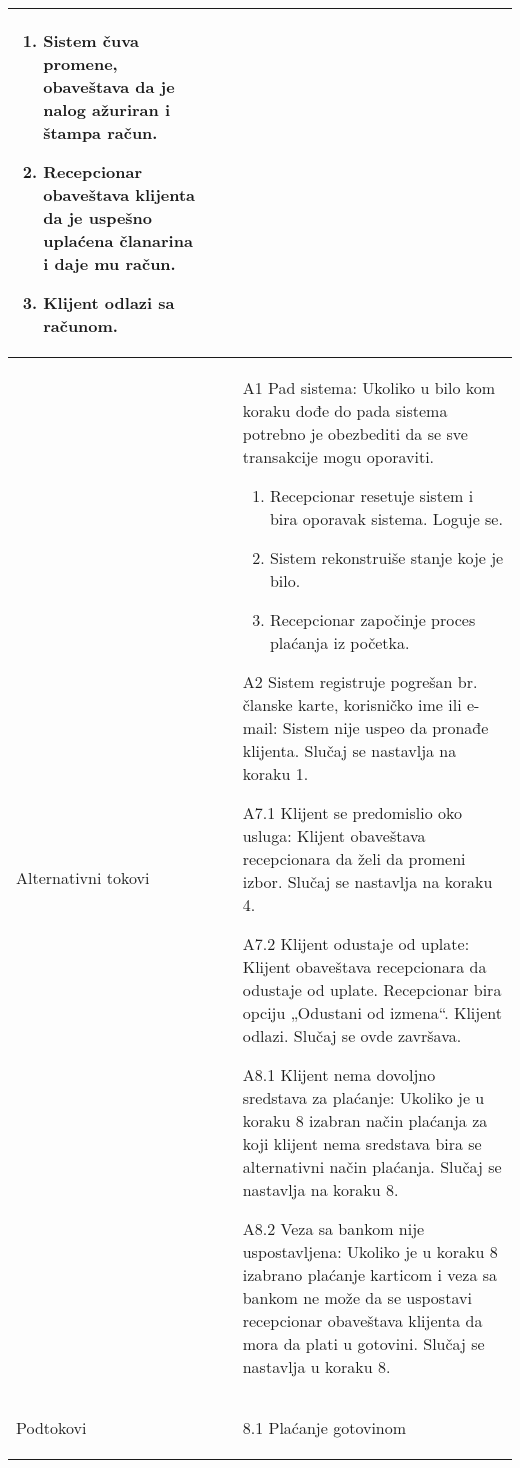 \documentclass[../main.tex]{subfiles}
\begin{document}
\begin{longtable}{| p{} | p{} |}
\begin{enumerate}
        \item Sistem čuva promene, obaveštava da je nalog ažuriran i štampa račun.
        \item Recepcionar obaveštava klijenta da je uspešno uplaćena članarina i daje mu račun.
        \item Klijent odlazi sa računom.
    \end{enumerate}\\
\hline
    Alternativni tokovi & \begin{itemize}
        \item[A1] Pad sistema: Ukoliko u bilo kom koraku dođe do pada sistema potrebno je obezbediti da se sve transakcije mogu oporaviti.\begin{enumerate}
            \item Recepcionar resetuje sistem i bira oporavak sistema. Loguje se.
            \item Sistem rekonstruiše stanje koje je bilo.
            \item Recepcionar započinje proces plaćanja iz početka.
        \end{enumerate}
        \item[A2] Sistem registruje pogrešan br. članske karte, korisničko ime ili e-mail:  Sistem nije uspeo da pronađe klijenta. Slučaj se nastavlja na koraku 1.
        \item[A7.1] Klijent se predomislio oko usluga: Klijent obaveštava recepcionara da želi da promeni izbor. Slučaj se nastavlja na koraku 4.
        \item[A7.2] Klijent odustaje od uplate: Klijent obaveštava recepcionara da odustaje od uplate. Recepcionar bira opciju „Odustani od izmena“. Klijent odlazi. Slučaj se ovde završava.
        \item[A8.1] Klijent nema dovoljno sredstava za plaćanje: Ukoliko je u koraku 8 izabran način plaćanja za koji klijent nema sredstava bira se alternativni način plaćanja. Slučaj se nastavlja na koraku 8.
        \item[A8.2] Veza sa bankom nije uspostavljena: Ukoliko je u koraku 8 izabrano plaćanje karticom i veza sa bankom ne može da se uspostavi recepcionar obaveštava klijenta da mora da plati u gotovini. Slučaj se nastavlja u koraku 8.
    \end{itemize}\\
\hline
    Podtokovi & \begin{itemize}
        \item[8.1] Plaćanje gotovinom \begin{enumerate}

\end{enumerate}
\end{itemize}
\end{longtable}
\end{document}
